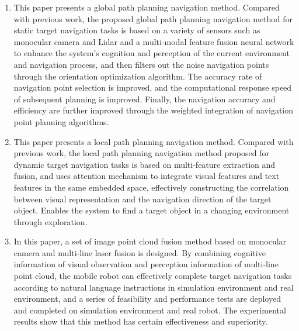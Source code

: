     \begin{enumerate}[topsep = 0 pt, itemsep= 0 pt, parsep=0pt, partopsep=0pt, leftmargin=44pt, itemindent=0pt, labelsep=6pt, label=(\arabic*)]
        \item 	This paper presents a global path planning navigation method. Compared with previous work, the proposed global path planning navigation method for static target navigation tasks is based on a variety of sensors such as monocular camera and Lidar and a multi-modal feature fusion neural network to enhance the system's cognition and perception of the current environment and navigation process, and then filters out the noise navigation points through the orientation optimization algorithm. The accuracy rate of navigation point selection is improved, and the computational response speed of subsequent planning is improved. Finally, the navigation accuracy and efficiency are further improved through the weighted integration of navigation point planning algorithms.
        \item	This paper presents a local path planning navigation method. Compared with previous work, the local path planning navigation method proposed for dynamic target navigation tasks is based on multi-feature extraction and fusion, and uses attention mechanism to integrate visual features and text features in the same embedded space, effectively constructing the correlation between visual representation and the navigation direction of the target object. Enables the system to find a target object in a changing environment through exploration.
        \item	In this paper, a set of image point cloud fusion method based on monocular camera and multi-line laser fusion is designed. By combining cognitive information of visual observation and perception information of multi-line point cloud, the mobile robot can effectively complete target navigation tasks according to natural language instructions in simulation environment and real environment, and a series of feasibility and performance tests are deployed and completed on simulation environment and real robot. The experimental results show that this method has certain effectiveness and superiority.
    \end{enumerate}


